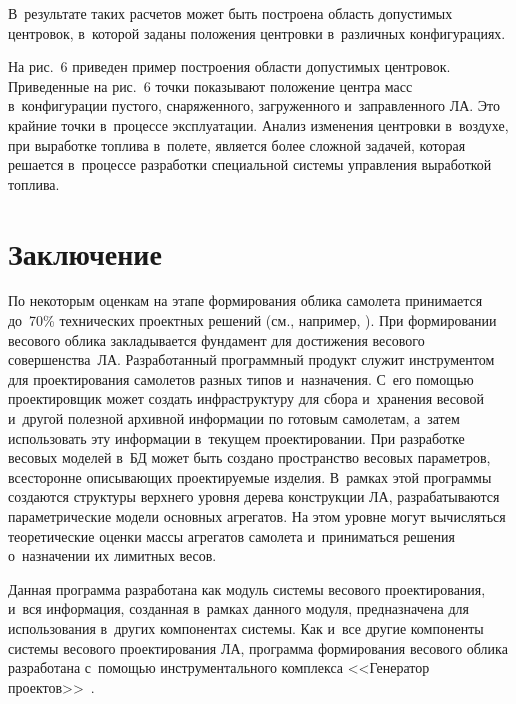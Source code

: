 \begin{multicols}{2}
  
 В~результате таких расчетов может быть построена область допустимых 
центровок, в~которой заданы положения центровки в~различных 
конфигурациях. 

На рис.~6 приведен пример построения об\-ласти допустимых 
центровок.
 Приведенные на рис.~6 точки показывают положение центра масс 
в~конфигурации пустого, снаряженного, загруженного и~заправленного ЛА. 
Это крайние точки в~процессе эксплуатации. Анализ изменения центровки 
в~воздухе, при выработке топлива в~полете, является более сложной задачей, 
которая решается в~процессе разработки специальной системы управления 
выработкой топлива.



  \section{Заключение}

  По некоторым оценкам на этапе формирования облика самолета принимается 
до~70\% технических проектных решений (см., например, \cite[с.~72]{5-fl}). При 
формировании весового облика закладывается фундамент для достижения 
весового совершенства~ЛА. 
%
Разработанный программный 
продукт служит инструментом для проектирования самолетов разных типов 
и~назначения. С~его по\-мощью проектировщик может создать инфраструктуру 
для сбора и~хранения весовой и~другой полезной архивной информации по 
готовым самолетам, а~затем использовать эту информации в~текущем 
проектировании.
%
 При разработке весовых моделей в~БД может быть создано 
пространство весовых параметров, всесторонне описывающих проектируемые 
изделия. В~рамках этой программы создаются структуры верхнего уровня 
дерева конструкции ЛА, разрабатываются параметрические модели основных 
агрегатов. На этом уровне могут вычисляться теоретические оценки массы 
агрегатов самолета и~приниматься решения о~назначении их лимитных весов.

Данная программа разработана как модуль сис\-те\-мы весового проектирования, 
и~вся информация, созданная в~рамках данного модуля, предназначена для 
использования в~других компонентах системы. Как и~все другие компоненты 
сис\-те\-мы весового проектирования ЛА, программа формирования весового 
облика разработана с~по\-мощью инструментального комплекса <<Генератор 
проектов>>~\cite{6-fl}.



\end{multicols}
